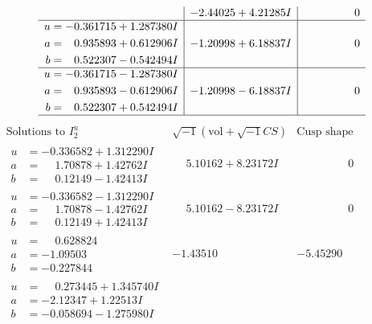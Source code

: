 \documentclass[1p]{elsarticle_modified}
\theoremstyle{definition}
\newcommand{\I}{\sqrt{-1}}
\begin{document}
$$\begin{array}{c|c|c}
 & -2.44025 + 4.21285 I & \phantom{-0.000000 } 0 \\ \hline\begin{aligned}
u &= -0.361715 + 1.287380 I \\
a &= \phantom{-}0.935893 + 0.612906 I \\
b &= \phantom{-}0.522307 - 0.542494 I\end{aligned}
 & -1.20998 + 6.18837 I & \phantom{-0.000000 } 0 \\ \hline\begin{aligned}
u &= -0.361715 - 1.287380 I \\
a &= \phantom{-}0.935893 - 0.612906 I \\
b &= \phantom{-}0.522307 + 0.542494 I\end{aligned}
 & -1.20998 - 6.18837 I & \phantom{-0.000000 } 0\\
 \hline 
 \end{array}$$\newpage$$\begin{array}{c|c|c}  
\text{Solutions to }I^u_{2}& \I (\text{vol} + \sqrt{-1}CS) & \text{Cusp shape}\\
 \hline 
\begin{aligned}
u &= -0.336582 + 1.312290 I \\
a &= \phantom{-}1.70878 + 1.42762 I \\
b &= \phantom{-}0.12149 - 1.42413 I\end{aligned}
 & \phantom{-}5.10162 + 8.23172 I & \phantom{-0.000000 } 0 \\ \hline\begin{aligned}
u &= -0.336582 - 1.312290 I \\
a &= \phantom{-}1.70878 - 1.42762 I \\
b &= \phantom{-}0.12149 + 1.42413 I\end{aligned}
 & \phantom{-}5.10162 - 8.23172 I & \phantom{-0.000000 } 0 \\ \hline\begin{aligned}
u &= \phantom{-}0.628824\phantom{ +0.000000I} \\
a &= -1.09503\phantom{ +0.000000I} \\
b &= -0.227844\phantom{ +0.000000I}\end{aligned}
 & -1.43510\phantom{ +0.000000I} & -5.45290\phantom{ +0.000000I} \\ \hline\begin{aligned}
u &= \phantom{-}0.273445 + 1.345740 I \\
a &= -2.12347 + 1.22513 I \\
b &= -0.058694 - 1.275980 I\end{aligned}

\end{array}$$
\end{document}

